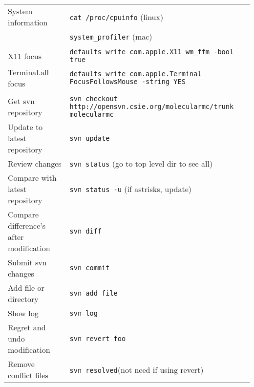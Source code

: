 \documentclass[a4paper,10pt]{article}
\begin{document}
\begin{table}
\begin{tabular}{ll}
System information  & \verb"cat /proc/cpuinfo" (linux) \\
                    & \verb"system_profiler" (mac) \\
\\
X11 focus           & \verb"defaults write com.apple.X11 wm_ffm -bool true"\\
Terminal.all focus  & \verb"defaults write com.apple.Terminal FocusFollowsMouse -string YES"\\
\\
Get svn repository   & \verb"svn checkout http://opensvn.csie.org/molecularmc/trunk molecularmc"\\
Update to latest repository & \verb"svn update"\\
Review changes       & \verb"svn status" (go to top level dir to see all)\\
Compare with latest repository & \verb"svn status -u" (if astrisks, update)\\
Compare difference's after modification& \verb"svn diff"\\
Submit svn changes   & \verb"svn commit"\\
Add file or directory& \verb"svn add file"\\
Show log             & \verb"svn log"\\
Regret and undo modification & \verb"svn revert foo"\\
Remove conflict files        & \verb"svn resolved"(not need if using revert)\\
\hline
\end{tabular}
\end{table}
\end{document}
